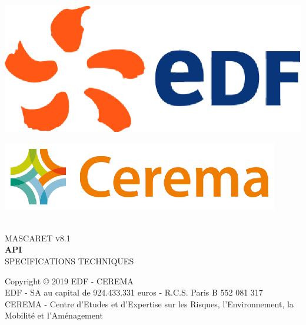 \documentclass[a4paper,11pt]{article}
\begin{document}
\begin{titlepage}

\begin{center}

\begin{minipage}{0.4\textwidth}
\begin{flushleft} \large
\includegraphics[scale=0.4]{./Figures/EDF_Logo.eps}
\end{flushleft}
\end{minipage}
\begin{minipage}{0.4\textwidth}
\begin{flushright} \large
\includegraphics[scale=1.]{./Figures/CEREMA_Logo.eps}
\end{flushright}
\end{minipage}
\textsc{ }\\[7cm]
\textsc{\Huge MASCARET v8.1}\\[1cm]
{ \huge \bfseries API}\\[1cm]
\textsc{\Large SPECIFICATIONS TECHNIQUES}\\
\vfill

{\Large Copyright {\copyright} 2019 EDF - CEREMA}\\[0.5cm]
{EDF - SA au capital de 924.433.331 euros - R.C.S. Paris B 552 081 317}\\
{CEREMA - Centre d'Etudes et d'Expertise sur les Risques, l'Environnement, la Mobilit\'e et l'Am\'enagement}

\end{center}

\end{titlepage}
\end{document}
